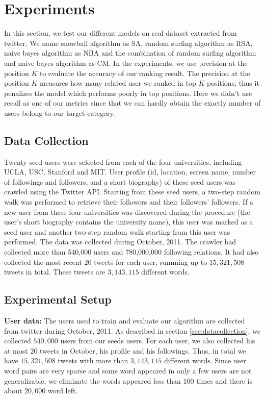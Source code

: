 \documentclass{article}
\begin{document}
\section{Experiments}\label{sec:experiment}
In this section, we test our different models on real dataset extracted from twitter. We name snowball algorithm as SA, random surfing algorithm as RSA, naive bayes algorithm as NBA and the combination of random surfing algorithm and naive bayes algorithm as CM. In the experiments, we use precision at the position $K$ to evaluate the accuracy of our ranking result. The precision at the position $K$ measures how many related user we ranked in top $K$ positions, thus it penalizes the model which performs poorly in top positions. Here we didn't use recall as one of our metrics since that we can hardly obtain the exactly number of users belong to our target category.

\subsection{Data Collection}
Twenty seed users were selected from each of the four universities, including UCLA, USC, Stanford and MIT. User profile (id, location, screen name, number of followings and followers, and a short biography) of these seed users was crawled using the Twitter API. Starting from these seed users, a two-step random walk was performed to retrieve their followers and their followers' followers. If a new user from these four universities was discovered during the procedure (the user's short biography contains the university name), this user was marked as a seed user and another two-step random walk starting from this user was performed. The data was collected during October, 2011. The crawler had collected more than 540,000 users and 780,000,000 following relations. It had also collected the most recent 20 tweets for each user, summing up to $15,321,508$ tweets in total. These tweets are $3,143,115$ different words.

\subsection{Experimental Setup}
\textbf{User data:} The users used to train and evaluate our algorithm are collected from twitter during October, 2011. As described in section \ref{sec:datacollection}, we collected $540,000$ users from our seeds users. For each user, we also collected his at most $20$ tweets in October, his profile and his followings. Thus, in total we have $15,321,508$ tweets with more than $3,143,115$ different words. Since user word pairs are very sparse and some word appeared in only a few users are not generalizable, we eliminate the words appeared less than $100$ times and there is about $20,000$ word left.
\end{document}
